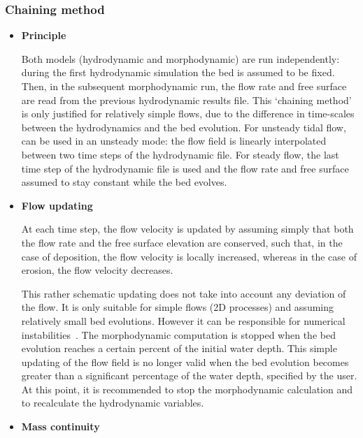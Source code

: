 \subsubsection{Chaining method}
\begin{itemize}
\item \textbf{Principle}

Both models (hydrodynamic and morphodynamic) are run independently: during the first hydrodynamic simulation 
the bed is assumed to be fixed. Then, in the subsequent morphodynamic run, 
the flow rate and free surface are read from the previous hydrodynamic results file.
This `chaining method' is only justified for relatively simple flows, due to
the difference in time-scales between the hydrodynamics and the bed
evolution. For unsteady tidal flow, \sisyphe can be used in an unsteady mode:
the flow field is linearly interpolated between two time steps of the
hydrodynamic file. For steady flow, the last time step of the hydrodynamic
file is used and the flow rate and free surface assumed to stay constant
while the bed evolves. 
\\


\item \textbf{Flow updating}

At each time step, the flow velocity is updated by assuming simply that both
the flow rate and the free surface elevation are conserved, such that, in
the case of deposition, the flow velocity is locally increased, whereas in
the case of erosion, the flow velocity decreases.

This rather schematic updating does not take into account any deviation of
the flow. It is only suitable for simple flows (2D processes) and assuming
relatively small bed evolutions. However it can be responsible for numerical
instabilities~\cite{}.%
The morphodynamic computation is stopped when the bed evolution reaches a
certain percent of the initial water depth. This simple updating of the flow
field is no longer valid when the bed evolution becomes greater than a
significant percentage of the water depth, specified by the user. At this
point, it is recommended to stop the morphodynamic calculation and to
recalculate the hydrodynamic variables. 
\\

\item \textbf{Mass continuity}


\end{itemize}
